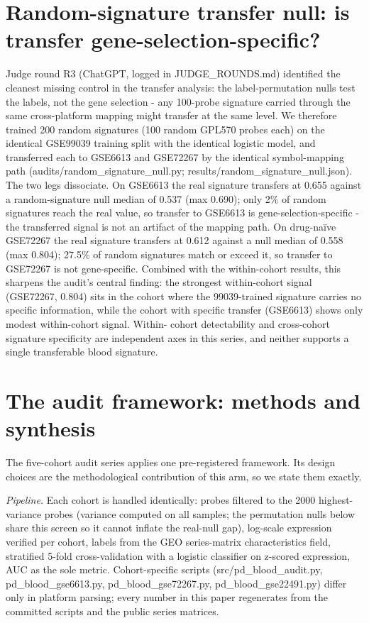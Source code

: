 \section{Random-signature transfer null: is transfer gene-selection-specific?}
Judge round R3 (ChatGPT, logged in JUDGE\_ROUNDS.md) identified the cleanest
missing control in the transfer analysis: the label-permutation nulls test the
labels, not the gene selection - any 100-probe signature carried through the
same cross-platform mapping might transfer at the same level. We therefore
trained 200 random signatures (100 random GPL570 probes each) on the identical
GSE99039 training split with the identical logistic model, and transferred each
to GSE6613 and GSE72267 by the identical symbol-mapping path
(audits/random\_signature\_null.py; results/random\_signature\_null.json).
The two legs dissociate. On GSE6613 the real signature transfers at 0.655
against a random-signature null median of 0.537 (max 0.690); only 2\% of
random signatures reach the real value, so transfer to GSE6613 is
gene-selection-specific - the transferred signal is not an artifact of the
mapping path. On drug-na\"ive GSE72267 the real signature transfers at 0.612
against a null median of 0.558 (max 0.804); 27.5\% of random signatures match
or exceed it, so transfer to GSE72267 is not gene-specific. Combined with the
within-cohort results, this sharpens the audit's central finding: the strongest
within-cohort signal (GSE72267, 0.804) sits in the cohort where the
99039-trained signature carries no specific information, while the cohort with
specific transfer (GSE6613) shows only modest within-cohort signal. Within-
cohort detectability and cross-cohort signature specificity are independent
axes in this series, and neither supports a single transferable blood
signature.
\section{The audit framework: methods and synthesis}
The five-cohort audit series applies one pre-registered framework. Its design
choices are the methodological contribution of this arm, so we state them
exactly.

\emph{Pipeline.} Each cohort is handled identically: probes filtered to the
2000 highest-variance probes (variance computed on all samples; the permutation
nulls below share this screen so it cannot inflate the real-null gap),
log-scale expression verified per cohort, labels from the GEO series-matrix
characteristics field, stratified 5-fold cross-validation with a logistic
classifier on z-scored expression, AUC as the sole metric. Cohort-specific
scripts (src/pd\_blood\_audit.py, pd\_blood\_gse6613.py, pd\_blood\_gse72267.py,
pd\_blood\_gse22491.py) differ only in platform parsing; every number in this
paper regenerates from the committed scripts and the public series matrices.

